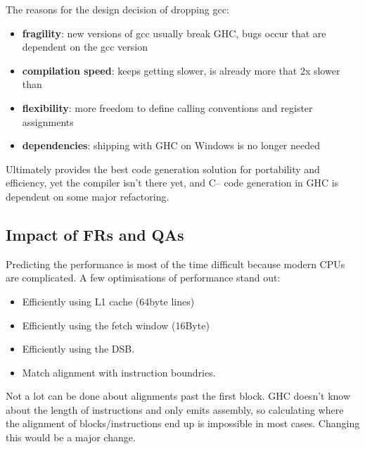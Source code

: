\begin{design}
The reasons for the design decision of dropping gcc:
\begin{itemize}
    \item \textbf{fragility}: new versions of gcc usually break GHC, bugs occur that are dependent on the gcc version
    \item \textbf{compilation speed}:  keeps getting slower,  is already more that 2x slower than 
    \item \textbf{flexibility}: more freedom to define calling conventions and register assignments
    \item \textbf{dependencies}: shipping  with GHC on Windows is no longer needed
\end{itemize}

Ultimately  provides the best code generation solution for portability and efficiency, yet the compiler isn't there yet, and C-- code generation in GHC is dependent on some major refactoring.

\end{design}


\subsection{Impact of FRs and QAs}

Predicting the performance is most of the time difficult because modern CPUs are complicated. A few optimisations of performance stand out:

\begin{itemize}
    \item Efficiently using L1 cache (64byte lines)
    \item Efficiently using the fetch window (16Byte)
    \item Efficiently using the DSB.
    \item Match alignment with instruction boundries.
\end{itemize}

Not a lot can be done about alignments past the first block. GHC doesn't know about the length of instructions and only emits assembly, so calculating where the alignment of blocks/instructions end up is impossible in most cases. Changing this would be a major change.

